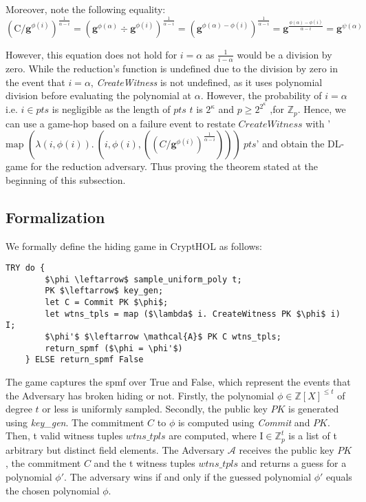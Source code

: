 Moreover, note the following equality: 
\begin{equation*}
    (\text{C} / \mathbf{g}^{\phi(i)})^{\frac{1}{\alpha-i}}
    = (\mathbf{g}^{\phi(\alpha)} \div \mathbf{g}^{\phi(i)})^{\frac{1}{\alpha-i}}
    = (\mathbf{g}^{\phi(\alpha)-\phi(i)})^{\frac{1}{\alpha-i}}
    = \mathbf{g}^{\frac{\phi(\alpha)-\phi(i)}{\alpha-i}}
    = \mathbf{g}^{\psi(\alpha)}
\end{equation*}


However, this equation does not hold for  $i=\alpha$ as $\frac{1}{i-\alpha}$ would be a division by zero. While the reduction's function is undefined due to the division by zero in the event that $i=\alpha$,  \textit{CreateWitness} is not undefined, as it uses polynomial division before evaluating the polynomial at $\alpha$.
However, the probability of $i=\alpha$ i.e. $i\in pts$ is negligible as the length of $pts$ $t$ is $2^\kappa$ and $p\ge 2^{2^\kappa}$ ,for $\mathbb{Z}_p$. Hence, we can use a game-hop based on a failure event to restate $CreateWitness$ with '$\text{map } (\lambda (i,\phi(i)).\ (i,\phi(i), ((C/\mathbf{g}^{\phi(i)})^{\frac{1}{\alpha-i}})))\ pts$' and obtain the DL-game for the reduction adversary. Thus proving the theorem stated at the beginning of this subsection.

 
\subsection*{Formalization}
\label{security:hiding:formalization}
We formally define the hiding game in CryptHOL as follows:
\begin{lstlisting}[language=isabelle]
    TRY do {
        $\phi \leftarrow$ sample_uniform_poly t;
        PK $\leftarrow$ key_gen;
        let C = Commit PK $\phi$;
        let wtns_tpls = map ($\lambda$ i. CreateWitness PK $\phi$ i) I;
        $\phi'$ $\leftarrow \mathcal{A}$ PK C wtns_tpls;
        return_spmf ($\phi = \phi'$)
    } ELSE return_spmf False
\end{lstlisting}
The game captures the spmf over True and False, which represent the events that the Adversary has broken hiding or not.
Firstly, the polynomial $\phi\in\mathbb{Z}[X]^{\le t}$ of degree $t$ or less is uniformly sampled.
Secondly, the public key $PK$ is generated using \textit{key\_gen}. 
The commitment $C$ to $\phi$ is computed using \textit{Commit} and $PK$. Then, t valid witness tuples $wtns\_tpls$ are computed, where $\text{I}\in\mathbb{Z}_p^t$ is a list of t arbitrary but distinct field elements.
The Adversary $\mathcal{A}$ receives the public key $PK$, the commitment $C$ and the t witness tuples $wtns\_tpls$ and returns a guess for a polynomial $\phi'$.
The adversary wins if and only if the guessed polynomial $\phi'$ equals the chosen polynomial $\phi$.

